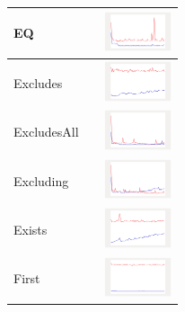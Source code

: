 \begin{longtable}{ m{2.5cm} m{8cm} m{2cm} }
EQ &

&
\includegraphics[width=2cm]{../graphs/sequence/small/EQ}
\\\hline

Excludes &

&
\includegraphics[width=2cm]{../graphs/sequence/small/Excludes}
\\\hline

ExcludesAll &

&
\includegraphics[width=2cm]{../graphs/sequence/small/ExcludesAll}
\\\hline

Excluding &

&
\includegraphics[width=2cm]{../graphs/sequence/small/Excluding}
\\\hline

Exists &

&
\includegraphics[width=2cm]{../graphs/sequence/small/Exists}
\\\hline

First &

&
\includegraphics[width=2cm]{../graphs/sequence/small/First}
\\\hline


\end{longtable}
